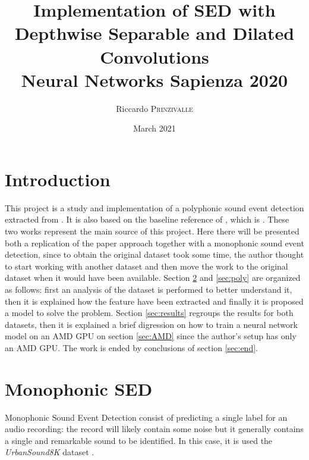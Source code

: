 \documentclass{article}
\title{Implementation of SED with Depthwise Separable and Dilated Convolutions \\[0.2em]\small{}Neural Networks Sapienza 2020} %
\author{Riccardo \textsc{Prinzivalle}} %
\date{March 2021} %
\begin{document}
\maketitle %



\section{Introduction}
\label{sec:intro}

This project is a study and implementation of a polyphonic sound event detection extracted from \cite{drossos2020sound}. It is also based on the baseline reference of \cite{drossos2020sound}, which is \cite{Cakir_2017}. These two works represent the main source of this project. Here there will be presented both a replication of the paper approach together with a monophonic sound event detection, since to obtain the original dataset took some time, the author thought to start working with another dataset and then move the work to the original dataset when it would have been available. Section \ref{sec:mono} and \ref{sec:poly} are organized as follows: first an analysis of the dataset is performed to better understand it, then it is explained how the feature have been extracted and finally it is proposed a model to solve the problem. Section \ref{sec:results} regroups the results for both datasets, then it is explained a brief digression on how to train a neural network model on an AMD GPU on section \ref{sec:AMD} since the author's setup has only an AMD GPU. The work is ended by conclusions of section \ref{sec:end}.
 

\section{Monophonic SED}
\label{sec:mono}

Monophonic Sound Event Detection consist of predicting a single label for an audio recording: the record will likely contain some noise but it generally contains a single and remarkable sound to be identified. In this case, it is used the \textit{UrbanSound8K} dataset \cite{Salamon:UrbanSound:ACMMM:14}.
\end{document}
